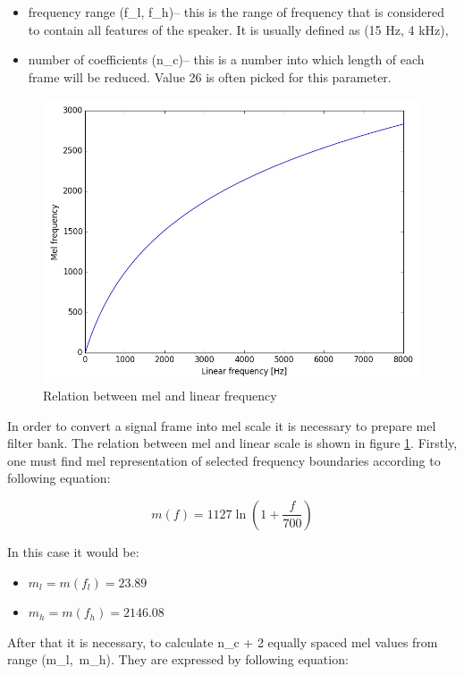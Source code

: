 \documentclass[magister]{dyplom}
\begin{document}
	\begin{itemize}
		\item frequency range (\gls{f_l}, \gls{f_h})-- this is the range of frequency that is considered to contain all features of the speaker. It is usually defined as (15 Hz, 4 kHz),
		\item number of coefficients (\gls{n_c})-- this is a number into which length of each frame will be reduced. Value 26 is often picked for this parameter.
	\end{itemize}
	
	\begin{figure} [!th]
		\centering
		\includegraphics[width=0.7\linewidth]{images/MFCC_mel_to_linear}
		\caption{Relation between mel and linear frequency}
		\label{fig:MFCC_mel_to_linear}
	\end{figure}
	
	In order to convert a signal frame into mel scale it is necessary to prepare mel filter bank. The relation between mel and linear scale is shown in figure \ref{fig:MFCC_mel_to_linear}. Firstly, one must find mel representation of selected frequency boundaries according to following equation:
	
	\begin{equation}
		m(f) = 1127 \ln\left(1 + \frac{f}{700}\right)
	\end{equation}
	
	In this case it would be:
	
	\begin{itemize}
		\item $m_l = m(f_l) = 23.89$
		\item $m_h = m(f_h) = 2146.08$
	\end{itemize}
	
	After that it is necessary, to calculate \gls{n_c} + 2 equally spaced mel values from range \mbox{(\gls{m_l}, \gls{m_h})}. They are expressed by following equation:
	
\end{document}

